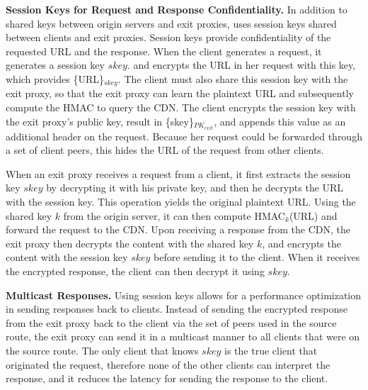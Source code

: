 \textbf{Session Keys for Request and Response Confidentiality.}
In addition to shared keys between origin servers and exit proxies, \system{} uses session keys shared 
between clients and exit proxies.  Session keys provide confidentiality of the requested URL and the 
response.  When the client generates a request, it generates a session key $skey$.
and encrypts 
the URL in her request with this key, which provides \{URL\}$_{skey}$.  The client
must also share this session key
with the exit proxy, so that the exit proxy can learn the plaintext URL and subsequently compute the HMAC to 
query the CDN.  The client encrypts the session key with the exit proxy's public key, result in \{skey\}$_{PK_{exit}}$, 
and appends this value as an additional header on the request.  Because her request
could be forwarded through 
a set of client peers, this hides the URL of the request from other clients.

When an exit proxy receives a request from a client, it first extracts the session
key $skey$ by decrypting it with 
his private key, and then he decrypts the URL with the session key.  This operation
yields the original plaintext
URL. Using the shared key $k$ from the origin server, it can then compute
HMAC$_k$(URL) and forward the request 
to the CDN.  Upon receiving a response from the CDN, the exit proxy then decrypts
the content with the shared key $k$, and
encrypts the content with the session key $skey$ before sending it to the client.
When it receives the encrypted response, 
the client can then decrypt it using $skey$.

\textbf{Multicast Responses.}
Using session keys allows for a performance optimization in sending responses back to clients.  Instead of sending 
the encrypted response from the exit proxy back to the client via the set of peers used in the source route, the exit 
proxy can send it in a multicast manner to all clients that were on the source route.  The only client that knows $skey$ 
is the true client that originated the request, therefore none of the other clients can interpret the response, and it reduces the 
latency for sending the response to the client.  

